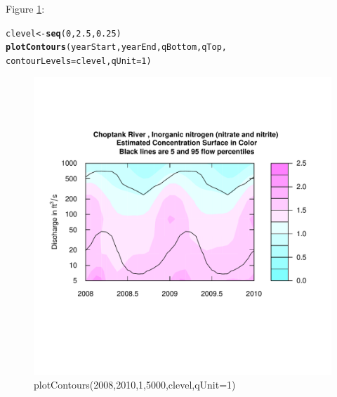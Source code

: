 \documentclass[a4paper,11pt]{article}\usepackage[]{graphicx}\usepackage[]{color}
\makeatletter
\newcommand{\hlnum}[1]{\textcolor[rgb]{0.686,0.059,0.569}{#1}}%
\newcommand{\hlstd}[1]{\textcolor[rgb]{0.345,0.345,0.345}{#1}}%
\newcommand{\hlkwb}[1]{\textcolor[rgb]{0.69,0.353,0.396}{#1}}%
\newcommand{\hlkwc}[1]{\textcolor[rgb]{0.333,0.667,0.333}{#1}}%
\newcommand{\hlkwd}[1]{\textcolor[rgb]{0.737,0.353,0.396}{\textbf{#1}}}%
\newenvironment{kframe}{%
 \def\at@end@of@kframe{}%
 \ifinner\ifhmode%
  \def\at@end@of@kframe{\end{minipage}}%
  \begin{minipage}{\columnwidth}%
 \fi\fi%
 \def\FrameCommand##1{\hskip\@totalleftmargin \hskip-\fboxsep
 \colorbox{shadecolor}{##1}\hskip-\fboxsep
     \hskip-\linewidth \hskip-\@totalleftmargin \hskip\columnwidth}%
 \MakeFramed {\advance\hsize-\width
   \@totalleftmargin\z@ \linewidth\hsize
   \@setminipage}}%
 {\par\unskip\endMakeFramed%
 \at@end@of@kframe}
\newenvironment{knitrout}{}{} %
\makeatother
\begin{document}
Figure \ref{fig:plotContours}:
\begin{knitrout}
\color{fgcolor}\begin{kframe}
\begin{alltt}
\hlstd{clevel}\hlkwb{<-}\hlkwd{seq}\hlstd{(}\hlnum{0}\hlstd{,}\hlnum{2.5}\hlstd{,}\hlnum{0.25}\hlstd{)}
\hlkwd{plotContours}\hlstd{(yearStart,yearEnd,qBottom,qTop,}
             \hlkwc{contourLevels} \hlstd{= clevel,}\hlkwc{qUnit}\hlstd{=}\hlnum{1}\hlstd{)}
\end{alltt}
\end{kframe}\begin{figure}[]

\includegraphics[width=1\linewidth,height=1\linewidth]{figure/plotContours} \caption[plotContours(2008,2010,1,5000,clevel,qUnit=1)]{plotContours(2008,2010,1,5000,clevel,qUnit=1)\label{fig:plotContours}}
\end{figure}


\end{knitrout}
\end{document}
